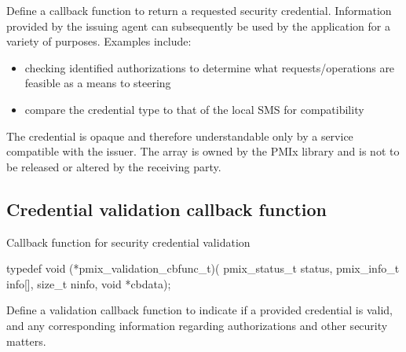 \descr

Define a callback function to return a requested security credential. Information provided by the issuing agent can subsequently be used
by the application for a variety of purposes. Examples include:

\begin{itemize}
    \item checking identified authorizations to determine what requests/operations are feasible as a means to steering 
    \item compare the credential type to that of the local SMS for compatibility
\end{itemize}

\adviceuserstart
The credential is opaque and therefore understandable only by a service compatible with the issuer. The  array is owned by the \ac{PMIx} library and is not to be released or altered by the receiving party.
\adviceuserend

\subsection{Credential validation callback function}

\summary

Callback function for security credential validation

\format

\cspecificstart
\begin{codepar}
typedef void (*pmix_validation_cbfunc_t)(
                             pmix_status_t status,
                             pmix_info_t info[], size_t ninfo,
                             void *cbdata);
\end{codepar}
\cspecificend

\begin{arglist}
\end{arglist}

\descr

Define a validation callback function to indicate if a provided credential is valid, and any corresponding information regarding authorizations and other security matters.

